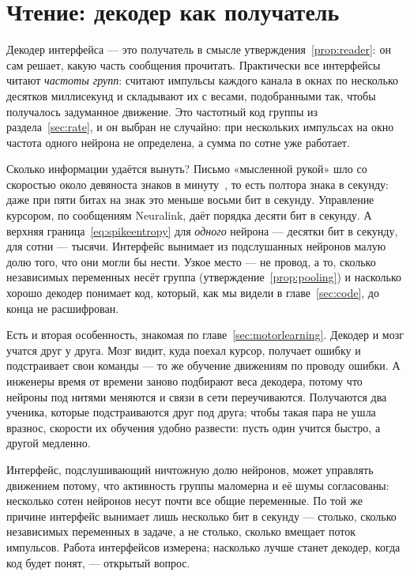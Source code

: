 \section{Чтение: декодер как получатель}

Декодер интерфейса --- это получатель в смысле утверждения~\ref{prop:reader}: он сам решает, какую часть сообщения прочитать. Практически все интерфейсы читают \emph{частоты групп}: считают импульсы каждого канала в окнах по несколько десятков миллисекунд и складывают их с весами, подобранными так, чтобы получалось задуманное движение. Это частотный код группы из раздела~\ref{sec:rate}, и он выбран не случайно: при нескольких импульсах на окно частота одного нейрона не определена, а сумма по сотне уже работает.

Сколько информации удаётся вынуть? Письмо «мысленной рукой» шло со скоростью около девяноста знаков в минуту~\cite{Willett2021}, то есть полтора знака в секунду: даже при пяти битах на знак это меньше восьми бит в секунду. Управление курсором, по сообщениям Neuralink, даёт порядка десяти бит в секунду. А верхняя граница~\eqref{eq:spikeentropy} для \emph{одного} нейрона --- десятки бит в секунду, для сотни --- тысячи. Интерфейс вынимает из подслушанных нейронов малую долю того, что они могли бы нести. Узкое место --- не провод, а то, сколько независимых переменных несёт группа (утверждение~\ref{prop:pooling}) и насколько хорошо декодер понимает код, который, как мы видели в главе~\ref{sec:code}, до конца не расшифрован.

Есть и вторая особенность, знакомая по главе~\ref{sec:motorlearning}. Декодер и мозг учатся друг у друга. Мозг видит, куда поехал курсор, получает ошибку и подстраивает свои команды --- то же обучение движениям по проводу ошибки. А инженеры время от времени заново подбирают веса декодера, потому что нейроны под нитями меняются и связи в сети переучиваются. Получаются два ученика, которые подстраиваются друг под друга; чтобы такая пара не ушла вразнос, скорости их обучения удобно развести: пусть один учится быстро, а другой медленно.

\begin{keyblock}
\begin{proposition}
\label{prop:probe}
Интерфейс, подслушивающий ничтожную долю нейронов, может управлять движением потому, что активность группы маломерна и её шумы согласованы: несколько сотен нейронов несут почти все общие переменные. По той же причине интерфейс вынимает лишь несколько бит в секунду --- столько, сколько независимых переменных в задаче, а не столько, сколько вмещает поток импульсов. Работа интерфейсов измерена; насколько лучше станет декодер, когда код будет понят, --- открытый вопрос.
\end{proposition}
\end{keyblock}

